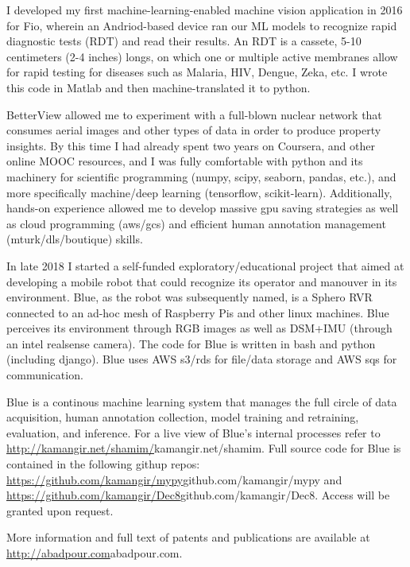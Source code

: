 I developed my first machine-learning-enabled machine vision application in 2016 for Fio, wherein an Andriod-based device ran our ML
models to recognize rapid diagnostic tests (RDT) and read their results. An RDT is a cassete, 5-10 centimeters (2-4 inches) longs, on
which one or multiple active membranes allow for rapid testing for diseases such as Malaria, HIV, Dengue, Zeka, etc. I wrote this 
code in Matlab and then machine-translated it to python. 

BetterView allowed me to experiment with a full-blown nuclear network that consumes aerial images and other types of data in order to 
produce property insights. By this time I had already spent two years on Coursera, and other online MOOC resources, and I was fully 
comfortable with python and its machinery for scientific programming (numpy, scipy, seaborn, pandas, etc.), and more specifically 
machine/deep learning (tensorflow, scikit-learn). Additionally, hands-on experience allowed me to develop massive gpu saving strategies 
as well as cloud programming (aws/gcs) and efficient human annotation management (mturk/dls/boutique) skills.

In late 2018 I started a self-funded exploratory/educational project that aimed at developing a mobile robot that could recognize its
operator and manouver in its environment. Blue, as the robot was subsequently named, is a Sphero RVR connected to an ad-hoc mesh of Raspberry 
Pis and other linux machines. Blue perceives its environment through RGB images as well as DSM+IMU (through an intel realsense camera). The 
code for Blue is written in bash and python (including django). Blue uses AWS s3/rds for file/data storage and AWS sqs for communication. 

Blue is a continous machine learning system that manages the full circle of data acquisition, human annotation collection, model training and
retraining, evaluation, and inference. For a live view of Blue's internal processes refer to \url{http://kamangir.net/shamim/}{kamangir.net/shamim}. 
Full source code for Blue is contained in the following githup repos: \url{https://github.com/kamangir/mypy}{github.com/kamangir/mypy} 
and \url{https://github.com/kamangir/Dec8}{github.com/kamangir/Dec8}. Access will be granted upon request. 

\vspace{0.5cm}
More information and full text of patents and publications are available at \url{http://abadpour.com}{abadpour.com}.

\vspace{1.5cm}
